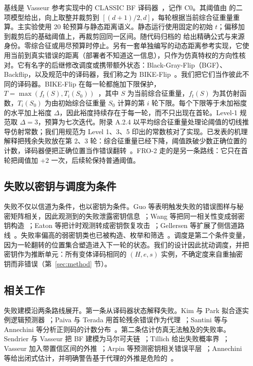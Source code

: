 基线是 Vasseur 参考实现中的 CLASSIC BF 译码器~\cite{vasseur2021thesis}，记作 C0。其阈值由  的二项模型给出，向上取整并裁剪到 $[(d+1)/2,d]$，每轮根据当前综合征重量重算。主实验使用 20 轮预算与静态距离语义。静态运行使用固定的初始 $t$；偏移加到裁剪后的基础阈值上，再裁剪回同一区间。随代码归档的  给出精确公式与来源身份。零综合征或用尽预算时停止。另有一套单独编写的动态距离参考实现，它使用当前到真实错误的距离（部署者不知道这一信息），只作为仿真特权的方向性核对。它有名字的后继修改调度或携带额外状态：Black-Gray-Flip（BGF）、Backflip，以及规范中的译码器，我们称之为 BIKE-Flip~\cite{drucker2020shades,vasseur2021thesis,bike2024spec}。我们把它们当作彼此不同的译码器。BIKE-Flip 在每一轮都施加下限保护，$T=\max(f_t(S),T_i(S_0))$~\cite{bike2024spec}，其中 $S$ 为当前综合征重量，$f_t(S)$ 为其仿射函数，$T_i(S_0)$ 为由初始综合征重量 $S_0$ 计算的第 $i$ 轮下限。每个下限等于未加裕度的水平加上裕度 $\Delta$，因此裕度持续存在于每一轮，而不只出现在首轮。Level-1 规范取 $\Delta=3$，预算为七次迭代。附录 A.2.4 以平均综合征重量处理论阈值的切线推导仿射常数；我们用规范为 Level 1、3、5 印出的常数核对了实现。已发表的机理解释把残余失败放在第 2、3 轮：综合征重量已经下降，阈值跌破少数正确位置的计数，译码器便把正确位置当作错误翻转~\cite{sendrier2024seminar,wang2023weak}。FRO-2 走的是另一条路线：它只在首轮把阈值加 $+2$ 一次，后续轮保持普通阈值。

\subsection{失败以密钥与调度为条件}

失败不仅以信道为条件，也以密钥为条件。Guo 等表明触发失败的错误图样与秘密矩阵相关，因此观测到的失败泄露密钥信息~\cite{guo2016key}；Wang 等把同一相关性变成弱密钥构造~\cite{wang2023weak}；Eaton 等把计时观测转成密钥恢复攻击~\cite{eaton2018timing}；Gellersen 等扩展了侧信道路线~\cite{gellersen2025}。失败率偏高的弱密钥类也已被构造、枚举和筛选~\cite{vasseur2021thesis,nosouhi2023weakkey,matthews2025combinatorial}。调度是第二个条件变量，因为一轮翻转的位置集合塑造进入下一轮的状态。我们的设计因此扰动调度，并把密钥作为推断单元：所有变体译码相同的 $(H,e,s)$ 实例，不确定度来自重抽密钥而非错误（第~\ref{sec:method} 节）。

\subsection{相关工作}

失败建模沿两条路线展开。第一条从译码器状态解释失败。Kim 与 Park 拟合逐实例逻辑预测器~\cite{kim2021logistic}；Paiva 与 Terada 用首轮残余错误作为代理~\cite{paiva2022pickyfix}；Santini 等与 Annechini 等分析正则码的计数分布~\cite{santini2019conservative,annechini2024estimation}。第二条估计仿真无法触及的失败率。Sendrier 与 Vasseur 把 BF 建模为马尔可夫链~\cite{sendrier2019dfr,sendrier2020lowdfr}；Tillich 给出失败概率界~\cite{tillich2018dfp}；Vasseur 加入带置信区间的外推~\cite{vasseur2021thesis}；Arpin 等预测密钥相关错误平层~\cite{arpin2025errorfloor}；Annechini 等给出闭式估计，并明确警告基于代理的外推是危险的~\cite{annechini2025closedform}。

